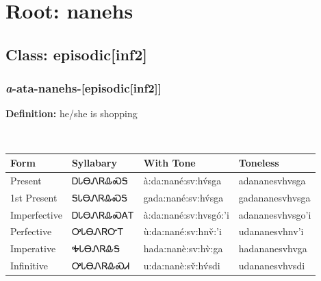 \needspace{4in}
\section*{Root: nanehs}
\nopagebreak
{}
\needspace{3in}
\subsection*{Class: episodic[inf2]}
\nopagebreak
\needspace{2in}
\subsubsection*{\textit{a}{-}ata{-}\textbf{nanehs}{-}[episodic[inf2]]}
\nopagebreak
\textbf{Definition: } he/she is shopping
\\[0.5em]
\begin{tabularx}{\textwidth}{l X X X}%
\toprule%
\textbf{Form}&\textbf{Syllabary}&\textbf{With Tone}&\textbf{Toneless}\\%
\midrule%
Present&ᎠᏓᎾᏁᏒᎲᏍᎦ&à:da:nané:sv:hv́sga&adananesvhvsga\\%
1st Present&ᎦᏓᎾᏁᏒᎲᏍᎦ&gada:nané:sv:hv́sga&gadananesvhvsga\\%
Imperfective&ᎠᏓᎾᏁᏒᎲᏍᎪᎢ&à:da:nané:sv:hvsgó:’i&adananesvhvsgo’i\\%
Perfective&ᎤᏓᎾᏁᏒᏅᎢ&ù:da:nané:sv:hnv̌:’i&udananesvhnv’i\\%
Imperative&ᎭᏓᎾᏁᏒᎲᎦ&hada:nanè:sv:hv̀:ga&hadananesvhvga\\%
Infinitive&ᎤᏓᎾᏁᏒᎲᏍᏗ&u:da:nanè:sv̌:hv́sdi&udananesvhvsdi\\%
\bottomrule%
\end{tabularx}
\\[1em]